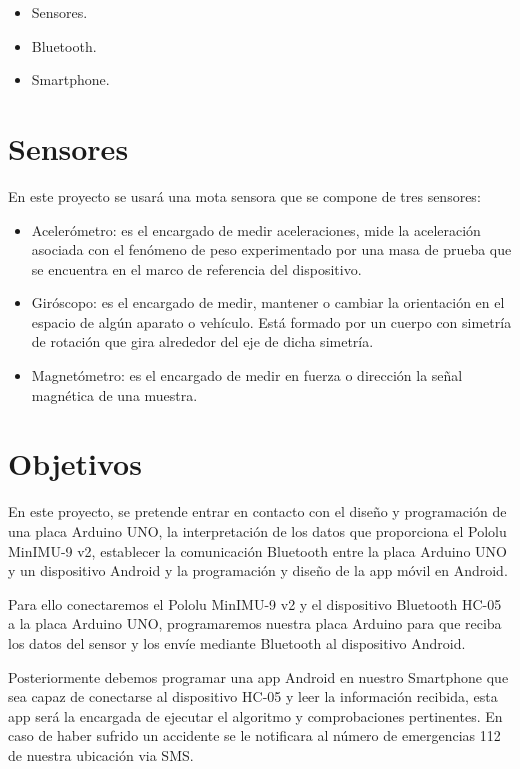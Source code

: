 		\begin{itemize}
			\item Sensores.
			\item Bluetooth.
			\item Smartphone.
		\end{itemize}
	
	\section{Sensores}
		En este proyecto se usar\'a una mota sensora que se compone de tres sensores:
		\begin{itemize}
			\item Aceler\'ometro: es el encargado de medir aceleraciones, mide la aceleraci\'on asociada con el fen\'omeno de peso experimentado por una masa de prueba que se encuentra en el marco de referencia del dispositivo.
			
			\item Gir\'oscopo: es el encargado de medir, mantener o cambiar la orientaci\'on en el espacio de algún aparato o veh\'iculo. Est\'a formado por un cuerpo con simetr\'ia de rotaci\'on que gira alrededor del eje de dicha simetr\'ia.
			
			\item Magnet\'ometro: es el encargado de medir en fuerza o direcci\'on la señal magn\'etica de una muestra. 
		\end{itemize}
	
	\section{Objetivos}
		En este proyecto, se pretende entrar en contacto con el dise\~no y programaci\'on de una placa Arduino UNO, la interpretaci\'on de los datos que proporciona el Pololu MinIMU-9 v2, establecer la comunicaci\'on Bluetooth entre la placa Arduino UNO y un dispositivo Android y la programaci\'on y dise\~no de la app m\'ovil en Android.
	
		Para ello conectaremos el Pololu MinIMU-9 v2 y el dispositivo Bluetooth HC-05 a la placa Arduino UNO, programaremos nuestra placa Arduino para que reciba los datos del sensor y los env\'ie mediante Bluetooth al dispositivo Android.
		
		Posteriormente debemos programar una app Android en nuestro Smartphone que sea capaz de conectarse al dispositivo HC-05 y leer la informaci\'on recibida, esta app ser\'a la encargada de ejecutar el algoritmo y comprobaciones pertinentes. En caso de haber sufrido un accidente se le notificara al n\'umero de emergencias 112 de nuestra ubicaci\'on via SMS.
		

